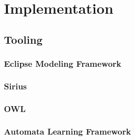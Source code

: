 \chapter{Implementation}

\section{Tooling} \label{sec_tooling}

\subsection{Eclipse Modeling Framework} \label{subsec_emf}

\subsection{Sirius} \label{subsec_sirius}

\subsection{OWL} \label{subsec_owl}

\subsection{Automata Learning Framework} \label{subsec_automatonlearning}

